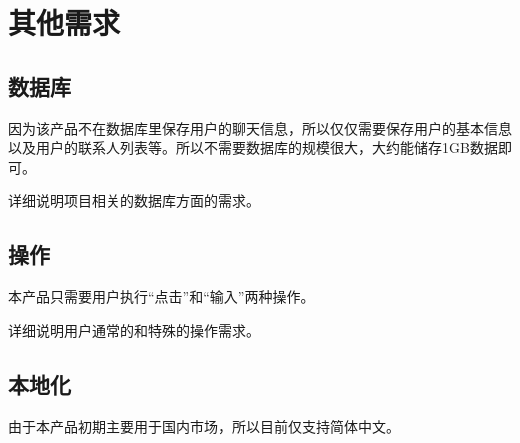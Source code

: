 \chapter{其他需求}
\iffalse
<Any other requirement specified by the customer need to be listed below with appropriate section. This may include Database, Coding requirements, Error handling, Testing requirements etc., Few sample requirements are listed below. Please note, you may remove or add if something is not applicable. >

使用适当的章节，详细说明任何其他客户需求，包括数据库，编码需求，错误处理，测试需求等。下面仅列出了少量样例，你可以删除和增加项目。
\fi
\section{数据库}
因为该产品不在数据库里保存用户的聊天信息，所以仅仅需要保存用户的基本信息以及用户的联系人列表等。所以不需要数据库的规模很大，大约能储存1GB数据即可。

详细说明项目相关的数据库方面的需求。
\section{操作}
本产品只需要用户执行“点击”和“输入”两种操作。

详细说明用户通常的和特殊的操作需求。
\section{本地化}
由于本产品初期主要用于国内市场，所以目前仅支持简体中文。
